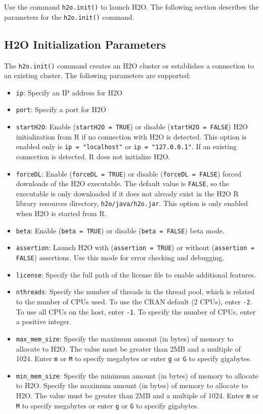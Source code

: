 Use the command {\texttt{h2o.init()}} to launch H2O. The following section describes the parameters for the {\texttt{h2o.init()}} command. 

\subsection{H2O Initialization Parameters}

The {\texttt{h2o.init()}} command creates an H2O cluster or establishes a connection to an existing cluster. The following parameters are supported: 

\begin{itemize}
\item {\texttt{ip}}: Specify an IP address for H2O
\item {\texttt{port}}: Specify a port for H2O
\item {\texttt{startH2O}}: Enable ({\texttt{startH2O = TRUE}}) or disable ({\texttt{startH2O = FALSE}}) H2O initialization from R if no connection with H2O is detected. This option is enabled only is {\texttt{ip = "localhost"}} or {\texttt{ip = "127.0.0.1"}}. If an existing connection is detected, R does not initialize H2O. 
\item {\texttt{forceDL}}: Enable ({\texttt{forceDL = TRUE}}) or disable ({\texttt{forceDL = FALSE}}) forced downloads of the H2O executable. The default value is {\texttt{FALSE}}, so the executable is  only downloaded if it does not already exist in the H2O R library resources directory, {\texttt{h2o/java/h2o.jar}}. This option is only enabled when H2O is started from R. 
\item {\texttt{beta}}:  Enable ({\texttt{beta = TRUE}}) or disable ({\texttt{beta = FALSE}}) beta mode. 
\item {\texttt{assertion}}: Launch H2O with ({\texttt{assertion = TRUE}}) or without ({\texttt{assertion = FALSE}}) assertions. Use this mode for error checking and debugging. 
\item {\texttt{license}}: Specify the full path of the license file to enable additional features. 
\item {\texttt{nthreads}}: Specify the number of threads in the thread pool, which is related to the number of CPUs used. To use the CRAN default (2 CPUs), enter {\texttt{-2}}. To use all CPUs on the host, enter {\texttt{-1}}. To specify the number of CPUs, enter a positive integer. 
\item {\texttt{max\_mem\_size}}: Specify the maximum amount (in bytes) of memory to allocate to H2O. The value must be greater than 2MB and a multiple of 1024. Enter {\texttt{m}} or {\texttt{M}} to specify megabytes or enter {\texttt{g}} or {\texttt{G}} to specify gigabytes. 
\item {\texttt{min\_mem\_size}}: Specify the minimum amount (in bytes) of memory to allocate to H2O. Specify the maximum amount (in bytes) of memory to allocate to H2O. The value must be greater than 2MB and a multiple of 1024. Enter {\texttt{m}} or {\texttt{M}} to specify megabytes or enter {\texttt{g}} or {\texttt{G}} to specify gigabytes.
\end{itemize}


